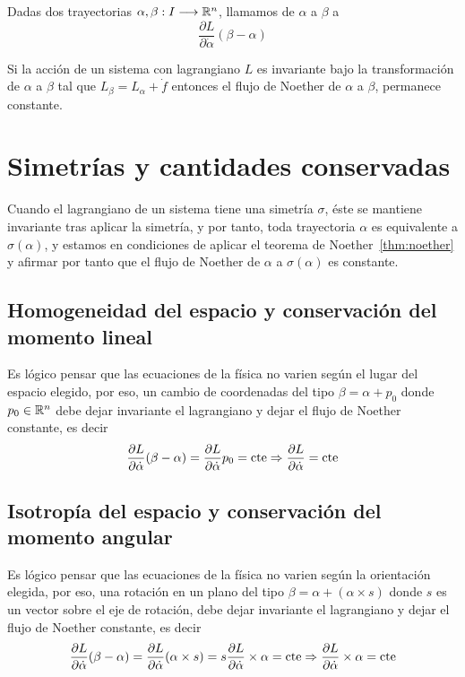 \begin{definition}
    Dadas dos trayectorias $\alpha,\beta:I\longrightarrow \mathbb{R}^n$, llamamos  de $\alpha$ a $\beta$ a
    \begin{equation}
        \label{eq:flujo_noether}
        \frac{\partial L}{\partial\dot{\alpha}}(\beta-\alpha)
    \end{equation}
\end{definition}

\begin{theorem}
    \label{thm:noether}
    Si la acción de un sistema con lagrangiano $L$ es invariante bajo la transformación de $\alpha$ a $\beta$ tal que $L_\beta=L_\alpha+\dot{f}$ entonces el flujo de Noether de $\alpha$ a $\beta$, permanece constante.
\end{theorem}


\chapter{Simetrías y cantidades conservadas}
Cuando el lagrangiano de un sistema tiene una simetría $\sigma$, éste se mantiene invariante tras aplicar la simetría, y por tanto, toda trayectoria $\alpha$ es equivalente a $\sigma(\alpha)$, y estamos en condiciones de aplicar el teorema de Noether~\ref{thm:noether} y afirmar por tanto que el flujo de Noether de $\alpha$ a $\sigma(\alpha)$ es constante.


\section{Homogeneidad del espacio y conservación del momento lineal}
Es lógico pensar que las ecuaciones de la física no varien según el lugar del espacio elegido, por eso, un cambio de coordenadas del tipo $\beta=\alpha+p_0$ donde $p_0\in\mathbb{R}^n$ debe dejar invariante el lagrangiano y dejar el flujo de Noether constante, es decir
\begin{equation}
    \label{eq:conservacion_momento_lineal}
    \frac{\partial L}{\partial\dot{\alpha}}(\beta-\alpha) = \frac{\partial L}{\partial\dot{\alpha}}p_0=\text{cte}\Rightarrow\frac{\partial L}{\partial\dot{\alpha}}=\text{cte}
\end{equation}


\section{Isotropía del espacio y conservación del momento angular}
Es lógico pensar que las ecuaciones de la física no varien según la orientación elegida, por eso, una rotación en un plano del tipo $\beta=\alpha + (\alpha\times s)$ donde $s$ es un vector sobre el eje de rotación, debe dejar invariante el lagrangiano y dejar el flujo de Noether constante, es decir
\begin{equation}
    \label{eq:conservacion_momento_angular}
    \frac{\partial L}{\partial\dot{\alpha}}(\beta-\alpha) = \frac{\partial L}{\partial\dot{\alpha}}(\alpha\times s) = s \frac{\partial L}{\partial\dot{\alpha}}\times \alpha=\text{cte}\Rightarrow\frac{\partial L}{\partial\dot{\alpha}}\times \alpha=\text{cte}
\end{equation}


